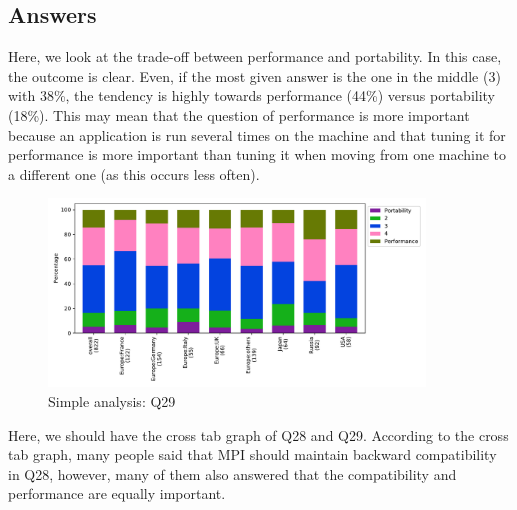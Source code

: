 
\subsection{Answers}


Here, we look at the trade-off between performance and portability. In this case,
the outcome is clear. Even, if the most given answer is the one in the middle (3)
with 38\%, the tendency is highly towards performance (44\%) versus portability
(18\%). This may mean that the question of performance is more important because an
application is run several times on the machine and that tuning it for performance
is more important than tuning it when moving from one machine to a different one
(as this occurs less often).  

\begin{figure}[htb]
\begin{center}
\includegraphics[width=10cm]{../pdfs/Q29.pdf}
\caption{Simple analysis: Q29}
\label{fig:Q29}
\end{center}
\end{figure}

Here, we should have the cross tab graph of Q28 and Q29. According to
the cross tab graph, many people said that MPI should maintain
backward compatibility in Q28, however, many of them also answered
that the compatibility and performance are equally important.
